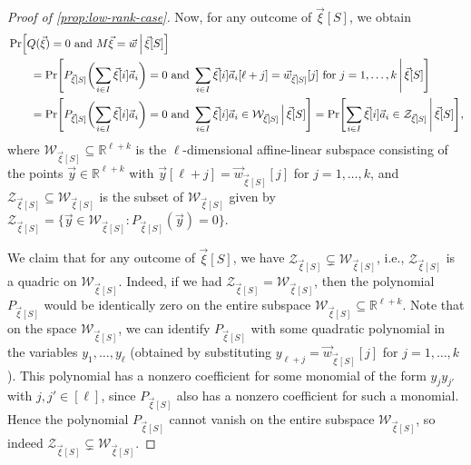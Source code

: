 \documentclass[english]{article}
\theoremstyle{remark}
\numberwithin{equation}{section}
\numberwithin{figure}{section}
\newcommand{\su}{\subseteq}
\newcommand{\RR}{\mathbb{R}}
\begin{document}
\begin{proof}[Proof of \cref{prop:low-rank-case}]
Now, for any outcome of $\vec \xi[S]$, we obtain
\begin{align*}
&\Pr\Bigl[Q(\vec \xi)=0\text{ and }M\vec{\xi}=\vec{w}\,\Big|\,\vec \xi[S]\Bigr]\\
&\qquad=
\Pr\Biggl[P_{\vec \xi[S]}\biggl(\sum_{i\in I}\vec \xi[i]\vec{a}_i\biggr)=0\text{ and }\sum_{i\in I}\vec \xi[i]\vec{a}_i[\ell+j]=\vec{w}_{\vec \xi[S]}[j]\text{ for }j=1,\dots,k\,\Bigg|\,\vec \xi[S]\Biggr]\\
&\qquad=\Pr\Biggl[P_{\vec \xi[S]}\biggl(\sum_{i\in I}\vec \xi[i]\vec{a}_i\biggr)=0\text{ and }\sum_{i\in I}\vec \xi[i]\vec{a}_i\in \mathcal{W}_{\vec \xi[S]}\,\Big|\,\vec \xi[S]\Biggr]=\Pr\Biggl[\sum_{i\in I}\vec \xi[i]\vec{a}_i\in \mathcal{Z}_{\vec \xi[S]}\,\Bigg|\,\vec \xi[S]\Biggr],
\end{align*}
where $\mathcal{W}_{\vec \xi[S]}\su \RR^{\ell+k}$ is the $\ell$-dimensional affine-linear subspace consisting of the points $\vec{y}\in \RR^{\ell+k}$ with $\vec{y}[\ell+j]=\vec{w}_{\vec \xi[S]}[j]$ for $j=1,\dots,k$, and $\mathcal{Z}_{\vec \xi[S]}\su \mathcal{W}_{\vec \xi[S]}$ is the subset of $\mathcal{W}_{\vec \xi[S]}$ given by $\mathcal{Z}_{\vec \xi[S]}=\{\vec{y}\in \mathcal{W}_{\vec \xi[S]}: P_{\vec \xi[S]}(\vec{y})=0\}$. 

We claim that for any outcome of $\vec \xi[S]$, we have $\mathcal{Z}_{\vec \xi[S]}\subsetneq \mathcal{W}_{\vec \xi[S]}$, i.e., $\mathcal{Z}_{\vec \xi[S]}$ is a quadric on $\mathcal{W}_{\vec \xi[S]}$. Indeed, if we had $\mathcal{Z}_{\vec \xi[S]}= \mathcal{W}_{\vec \xi[S]}$, then the polynomial $P_{\vec \xi[S]}$ would be identically zero on the entire subspace $\mathcal{W}_{\vec \xi[S]}\su \RR^{\ell+k}$. Note that on the space $\mathcal{W}_{\vec \xi[S]}$, we can identify $P_{\vec \xi[S]}$ with some quadratic polynomial in the variables $y_{1},\dots,y_{\ell}$ (obtained by substituting $y_{\ell+j}=\vec{w}_{\vec \xi[S]}[j]$ for $j=1,\dots,k$). This polynomial has a nonzero coefficient for some monomial of the form $y_jy_{j'}$ with $j,j'\in [\ell]$, since $P_{\vec \xi[S]}$ also has a nonzero coefficient for such a monomial. Hence the polynomial $P_{\vec \xi[S]}$ cannot vanish on the entire subspace $\mathcal{W}_{\vec \xi[S]}$, so indeed $\mathcal{Z}_{\vec \xi[S]}\subsetneq \mathcal{W}_{\vec \xi[S]}$.


\end{proof}
\end{document}
